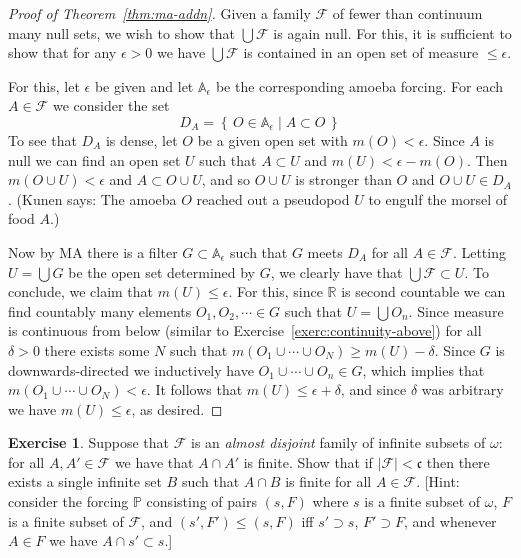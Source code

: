 \documentclass[11pt,oneside]{amsbook}
\newcommand{\set}[1]{\left\{\,#1\,\right\}}
\newcommand{\PP}{\mathbb P}
\theoremstyle{definition}
\newtheorem{exerc}{Exercise}[section]
\theoremstyle{plain}
\theoremstyle{definition}
\theoremstyle{remark}
\numberwithin{equation}{section}
\numberwithin{figure}{section}
\begin{document}
\begin{proof}[Proof of Theorem~\ref{thm:ma-addn}]
  Given a family $\mathcal F$ of fewer than continuum many null sets, we wish to show that $\bigcup\mathcal F$ is again null. For this, it is sufficient to show that for any $\epsilon>0$ we have $\bigcup\mathcal F$ is contained in an open set of measure $\leq\epsilon$.

  For this, let $\epsilon$ be given and let $\mathbb A_\epsilon$ be the corresponding amoeba forcing. For each $A\in\mathcal F$ we consider the set
  \[D_A=\set{O\in\mathbb A_\epsilon\mid A\subset O}
  \]
  To see that $D_A$ is dense, let $O$ be a given open set with $m(O)<\epsilon$. Since $A$ is null we can find an open set $U$ such that $A\subset U$ and $m(U)<\epsilon-m(O)$. Then $m(O\cup U)<\epsilon$ and $A\subset O\cup U$, and so $O\cup U$ is stronger than $O$ and $O\cup U\in D_A$. (Kunen says: The amoeba $O$ reached out a pseudopod $U$ to engulf the morsel of food $A$.)

  Now by MA there is a filter $G\subset\mathbb A_\epsilon$ such that $G$ meets $D_A$ for all $A\in\mathcal F$. Letting $U=\bigcup G$ be the open set determined by $G$, we clearly have that $\bigcup\mathcal F\subset U$. To conclude, we claim that $m(U)\leq\epsilon$. For this, since $\mathbb R$ is second countable we can find countably many elements $O_1,O_2,\cdots\in G$ such that $U=\bigcup O_n$. Since measure is continuous from below (similar to Exercise~\ref{exerc:continuity-above}) for all $\delta>0$ there exists some $N$ such that $m(O_1\cup\cdots\cup O_N)\geq m(U)-\delta$. Since $G$ is downwards-directed we inductively have $O_1\cup\cdots\cup O_n\in G$, which implies that $m(O_1\cup\cdots\cup O_N)<\epsilon$. It follows that $m(U)\leq\epsilon+\delta$, and since $\delta$ was arbitrary we have $m(U)\leq\epsilon$, as desired.
\end{proof}

\begin{exerc}
  Suppose that $\mathcal F$ is an \emph{almost disjoint} family of infinite subsets of $\omega$: for all $A,A'\in\mathcal F$ we have that $A\cap A'$ is finite. Show that if $|\mathcal F|<\mathfrak c$ then there exists a single infinite set $B$ such that $A\cap B$ is finite for all $A\in\mathcal F$. [Hint: consider the forcing $\PP$ consisting of pairs $(s,F)$ where $s$ is a finite subset of $\omega$, $F$ is a finite subset of $\mathcal F$, and $(s',F')\leq(s,F)$ iff $s'\supset s$, $F'\supset F$, and whenever $A\in F$ we have $A\cap s'\subset s$.]
\end{exerc}
\end{document}
